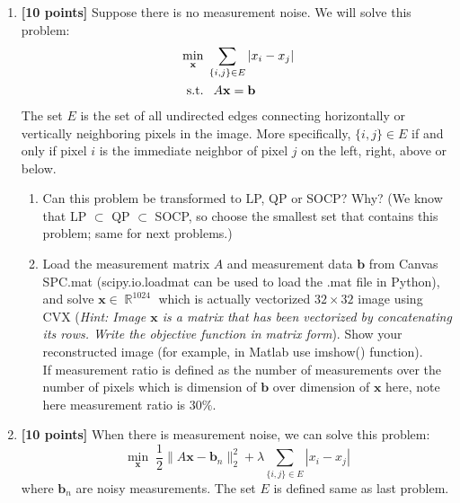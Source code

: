 \documentclass{article}
\DeclareMathOperator*{\R}{\mathbb R}
\newcommand{\bb}{\mathbf{b}}
\newcommand{\bx}{\mathbf{x}}
\begin{document}
\bigskip
\noindent
\begin{enumerate}

\item \textbf{[10 points]} Suppose there is no measurement noise. We will solve this problem:
\begin{equation}\label{}
\begin{split}
&\min_\bx  \; \sum_{\{i,j\} \in E}|x_i - x_{j}|  \\
&\text{ \,s.t.\,\, } A\bx = \bb
\end{split}
\end{equation}
The set $E$ is the set of all undirected edges connecting horizontally or
vertically neighboring pixels in the image. More specifically, $\{i,j\} \in E$
if and only if pixel $i$ is the immediate neighbor of pixel $j$ on the left,
right, above or below. 

	\begin{enumerate}
    	\item Can this problem be transformed to LP, QP or SOCP? Why? (We know that LP $\subset$ QP $\subset$ SOCP, so choose the smallest set that contains this problem; same for next problems.)
	\begin{tcolorbox}
	\end{tcolorbox}
        \item Load the measurement matrix $A$ and measurement data $\bb$ from Canvas SPC.mat (scipy.io.loadmat can be used to load the .mat file in Python), and solve $\bx \in \R^{1024}$ which is actually vectorized $32\times 32$ image using CVX ({\it Hint: Image $\bx$ is a matrix that has been vectorized by concatenating its rows. Write the objective function in matrix form}). Show your reconstructed image (for example, in Matlab use imshow() function). \\If measurement ratio is defined as the number of measurements over the number of pixels which is dimension of $\bb$ over dimension of $\bx$ here, note here measurement ratio is $30\%$. 
        \begin{tcolorbox}
	\end{tcolorbox}
    \end{enumerate}
    
\item \textbf{[10 points]} When there is measurement noise, we can solve this problem:
\begin{equation}\label{}
\min_\bx  \; \frac{1}{2}\|A\bx-\bb_n \|_2^2 + \lambda \sum_{\{i,j\} \in E}|x_i - x_{j}|  
\end{equation}
where $\bb_n$ are noisy measurements.
The set $E$ is defined same as last problem. 


\end{enumerate}
\end{document}
